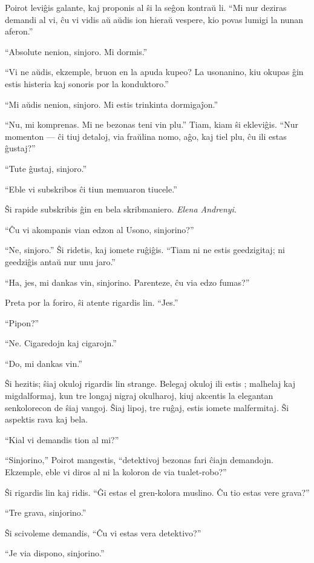 Poirot leviĝis galante, kaj proponis al ŝi la seĝon kontraŭ li. ``Mi nur deziras demandi al vi, ĉu vi vidis aŭ aŭdis ion hieraŭ vespere, kio povas lumigi la nunan aferon.''

``Absolute nenion, sinjoro. Mi dormis.''

``Vi ne aŭdis, ekzemple, bruon en la apuda kupeo? La usonanino, kiu okupas ĝin estis histeria kaj sonoris por la konduktoro.''

``Mi aŭdis nenion, sinjoro. Mi estis trinkinta dormigaĵon.''

``Nu, mi komprenas. Mi ne bezonas teni vin plu.'' Tiam, kiam ŝi ekleviĝis. ``Nur momenton --- ĉi tiuj detaloj, via fraŭlina nomo, aĝo, kaj tiel plu, ĉu ili estas ĝustaj?''

``Tute ĝustaj, sinjoro.''

``Eble vi subskribos ĉi tiun memuaron tiucele.''

Ŝi rapide subskribis ĝin en bela skribmaniero. \emph{Elena Andrenyi}.

``Ĉu vi akompanis vian edzon al Usono, sinjorino?''

``Ne, sinjoro.'' Ŝi ridetis, kaj iomete ruĝiĝis. ``Tiam ni ne estis geedzigitaj; ni geedziĝis antaŭ nur unu jaro.''

``Ha, jes, mi dankas vin, sinjorino. Parenteze, ĉu via edzo fumas?''

Preta por la foriro, ŝi atente rigardis lin. ``Jes.''

``Pipon?''

``Ne. Cigaredojn kaj cigarojn.''

``Do, mi dankas vin.''

Ŝi hezitis; ŝiaj okuloj rigardis lin strange. Belegaj okuloj ili estis ; malhelaj kaj migdalformaj, kun tre longaj nigraj okulharoj, kiuj akcentis la elegantan senkolorecon de ŝiaj vangoj. Ŝiaj lipoj, tre ruĝaj, estis iomete malfermitaj. Ŝi aspektis rava kaj bela.

``Kial vi demandis tion al mi?''

``Sinjorino,'' Poirot mangestis, ``detektivoj bezonas fari ĉiajn demandojn. Ekzemple, eble vi diros al ni la koloron de via tualet-robo?''

Ŝi rigardis lin kaj ridis. ``Ĝi estas el gren-kolora muslino. Ĉu tio estas vere grava?''

``Tre grava, sinjorino.''

Ŝi scivoleme demandis, ``Ĉu vi estas vera detektivo?''

``Je via dispono, sinjorino.''

